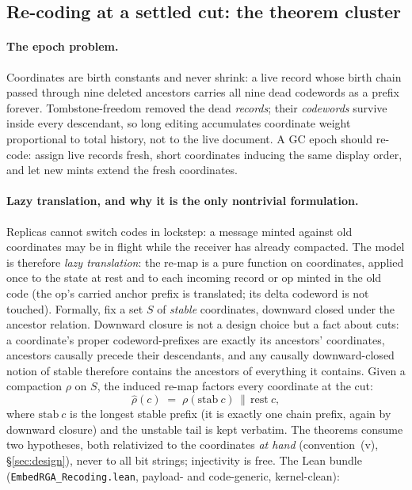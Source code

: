 \documentclass[11pt]{article}
\newcommand{\code}[1]{\texttt{#1}}
\begin{document}
\subsection{Re-coding at a settled cut: the theorem cluster}
\label{sec:recoding}

\paragraph{The epoch problem.} Coordinates are birth constants and
never shrink: a live record whose birth chain passed through nine
deleted ancestors carries all nine dead codewords as a prefix forever.
Tombstone-freedom removed the dead \emph{records}; their
\emph{codewords} survive inside every descendant, so long editing
accumulates coordinate weight proportional to total history, not to the
live document. A GC epoch should re-code: assign live records fresh,
short coordinates inducing the same display order, and let new mints
extend the fresh coordinates.

\paragraph{Lazy translation, and why it is the only nontrivial
formulation.} Replicas cannot switch codes in lockstep: a message
minted against old coordinates may be in flight while the receiver has
already compacted. The model is therefore \emph{lazy translation}: the
re-map is a pure function on coordinates, applied once to the state at
rest and to each incoming record or op minted in the old code (the op's
carried anchor prefix is translated; its delta codeword is not
touched). Formally, fix a set $S$ of \emph{stable} coordinates,
downward closed under the ancestor relation. Downward closure is not a
design choice but a fact about cuts: a coordinate's proper
codeword-prefixes are exactly its ancestors' coordinates, ancestors
causally precede their descendants, and any causally downward-closed
notion of stable therefore contains the ancestors of everything it
contains. Given a compaction $\rho$ on $S$, the induced re-map factors
every coordinate at the cut:
\[
  \hat\rho(c) \;=\; \rho(\mathrm{stab}\ c) \,\|\, \mathrm{rest}\ c,
\]
where $\mathrm{stab}\ c$ is the longest stable prefix (it is exactly
one chain prefix, again by downward closure) and the unstable tail is
kept verbatim. The theorems consume two hypotheses, both relativized to
the coordinates \emph{at hand} (convention~(v), \S\ref{sec:design}),
never to all bit strings; injectivity is free. The Lean bundle
(\code{EmbedRGA\_Recoding.lean}, payload- and code-generic,
kernel-clean):
\end{document}
